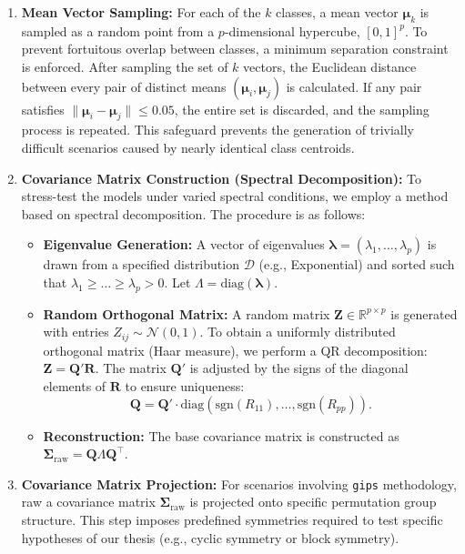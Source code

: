 \documentclass[a4paper,11pt,twoside]{report}
\theoremstyle{definition}
\begin{document}
\begin{enumerate}
    \item \textbf{Mean Vector Sampling:}
    For each of the $k$ classes, a mean vector $\boldsymbol{\mu}_k$ is sampled as a random point from a $p$-dimensional hypercube, $[0, 1]^p$. To prevent fortuitous overlap between classes, a minimum separation constraint is enforced. After sampling the set of $k$ vectors, the Euclidean distance between every pair of distinct means $(\boldsymbol{\mu}_i, \boldsymbol{\mu}_j)$ is calculated. If any pair satisfies $\|\boldsymbol{\mu}_i - \boldsymbol{\mu}_j\| \leq 0.05$, the entire set is discarded, and the sampling process is repeated. This safeguard prevents the generation of trivially difficult scenarios caused by nearly identical class centroids.

    \item \textbf{Covariance Matrix Construction (Spectral Decomposition):}
    To stress-test the models under varied spectral conditions, we employ a method based on spectral decomposition.  The procedure is as follows:
    \begin{itemize}
        \item \textbf{Eigenvalue Generation:} A vector of eigenvalues $\boldsymbol{\lambda} = (\lambda_1, \dots, \lambda_p)$ is drawn from a specified distribution $\mathcal{D}$ (e.g., Exponential) and sorted such that $\lambda_1 \ge \dots \ge \lambda_p > 0$. Let $\Lambda = \text{diag}(\boldsymbol{\lambda})$.
        \item \textbf{Random Orthogonal Matrix:} A random matrix $\mathbf{Z} \in \mathbb{R}^{p \times p}$ is generated with entries $Z_{ij} \sim \mathcal{N}(0, 1)$. To obtain a uniformly distributed orthogonal matrix (Haar measure), we perform a QR decomposition: $\mathbf{Z} = \mathbf{Q}'\mathbf{R}$. The matrix $\mathbf{Q}'$ is adjusted by the signs of the diagonal elements of $\mathbf{R}$ to ensure uniqueness:
        \begin{equation}
            \mathbf{Q} = \mathbf{Q}' \cdot \text{diag}\left(\text{sgn}(R_{11}), \dots, \text{sgn}(R_{pp})\right).
        \end{equation}
        \item \textbf{Reconstruction:} The base covariance matrix is constructed as $\boldsymbol{\Sigma}_{\text{raw}} = \mathbf{Q} \Lambda \mathbf{Q}^\top$.
    \end{itemize}

    \item \textbf{Covariance Matrix Projection:}
    For scenarios involving \texttt{gips} methodology, raw a covariance matrix $\boldsymbol{\Sigma}_{\text{raw}}$ is projected onto specific permutation group structure. This step imposes predefined symmetries required to test specific hypotheses of our thesis (e.g., cyclic symmetry or block symmetry).


\end{enumerate}
\end{document}
